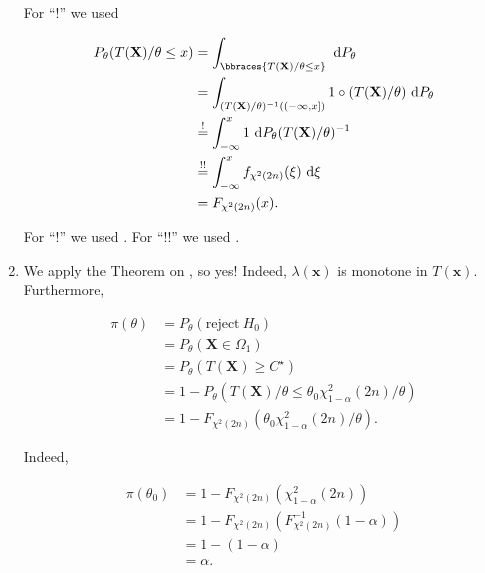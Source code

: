 \begin{solution}
\begin{enumerate}[label = (\alph*)]
    For \enquote ! we used

    \begin{align*}
        P_\theta(T(\mathbf X) / \theta \leq x)
        & =
        \int_\bbraces{T(\mathbf X) / \theta \leq x}
            ~ \mathrm d P_\theta \\
        & =
        \int_{(T(\mathbf X) / \theta)^{-1}((-\infty, x])}
            1 \circ (T(\mathbf X) / \theta)
            ~ \mathrm d P_\theta \\
        & \stackrel{!}{=}
        \int_{-\infty}^x
            1
            ~ \mathrm d P_\theta (T(\mathbf X) / \theta)^{-1} \\
        & \stackrel{!!}{=}
        \int_{-\infty}^x
            f_{\chi^2(2 n)}(\xi)
            ~ \mathrm d \xi \\
        & =
        F_{\chi^2(2 n)}(x).
    \end{align*}

    For \enquote ! we used \cite[Satz 9.62]{kusolitsch2014maß}.
    For \enquote{!!} we used \cite[Satz 9.49]{kusolitsch2014maß}.

    \item We apply the Theorem on \cite[lecture 10, slide 33]{EStat}, so yes!
    Indeed, $\lambda(\mathbf x)$ is monotone in $T(\mathbf x)$.
    Furthermore,

    \begin{align*}
        \pi(\theta)
        & =
        P_\theta(\text{reject}~ H_0) \\
        & =
        P_\theta(\mathbf X \in \Omega_1) \\
        & =
        P_\theta(T(\mathbf X) \geq C^\star) \\
        & =
        1 - P_\theta(T(\mathbf X) / \theta \leq \theta_0 \chi_{1 - \alpha}^2(2 n) / \theta) \\
        & =
        1 - F_{\chi^2(2 n)}(\theta_0 \chi_{1 - \alpha}^2(2 n) / \theta).
    \end{align*}

    Indeed,

    \begin{align*}
        \pi(\theta_0)
        & =
        1 - F_{\chi^2(2 n)}(\chi_{1 - \alpha}^2(2 n)) \\
        & =
        1 - F_{\chi^2(2 n)}(F_{\chi^2(2 n)}^{-1}(1 - \alpha)) \\
        & =
        1 - (1 - \alpha) \\
        & =
        \alpha.
    \end{align*}

\end{enumerate}

\end{solution}

